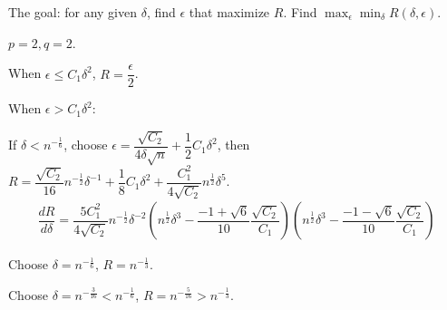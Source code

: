 \documentclass[11pt,letterpaper,english]{article}
\begin{document}
The goal: for any given $\delta$, find $\epsilon$ that maximize $R$. Find $\max_{\epsilon} \min_{\delta} R(\delta, \epsilon)$. 

$p=2, q=2$.

When $\epsilon \leq C_1 \delta^2$, $R = \dfrac{\epsilon}{2}$.

When $\epsilon > C_1\delta^2$:

If $\delta < n^{-\frac{1}{6}}$, 
choose $\epsilon = \dfrac{\sqrt{C_2}}{4\delta \sqrt{n}}+\dfrac{1}{2}C_1\delta^2$, 
then
$R = \dfrac{\sqrt{C_2}}{16}n^{-\frac{1}{2}}\delta^{-1}+\dfrac{1}{8}C_1\delta^2+\dfrac{C_1^2}{4\sqrt{C_2}}n^{\frac{1}{2}}\delta^5$.
\begin{align*}
\dfrac{dR}{d\delta} = \dfrac{5C_1^2}{4\sqrt{C_2}}n^{-\frac{1}{2}}\delta^{-2}\left( n^{\frac{1}{2}}\delta^{3}-\dfrac{-1+\sqrt{6}}{10}\dfrac{\sqrt{C_2}}{C_1} \right)\left( n^{\frac{1}{2}}\delta^{3}-\dfrac{-1-\sqrt{6}}{10}\dfrac{\sqrt{C_2}}{C_1} \right)
\end{align*}

Choose $\delta = n^{-\frac{1}{6}}$, $R= n^{-\frac{1}{3}}$.

Choose $\delta = n^{-\frac{3}{16}}<n^{-\frac{1}{6}}$, $R= n^{-\frac{5}{16}}>n^{-\frac{1}{3}}$.
\end{document}
